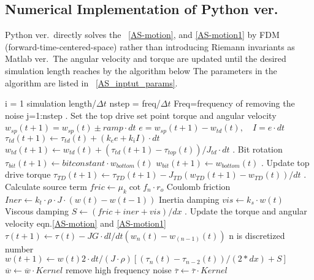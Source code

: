 \subsection{Numerical Implementation of Python ver.}
Python ver.\ directly solves the \equationname~\ref{AS-motion}, and \ref{AS-motion1} by FDM (forward-time-centered-space) rather than introducing Riemann invariants as Matlab ver.\ The angular velocity and torque are updated until the desired simulation length reaches by the algorithm below The parameters in the algorithm are listed in \tablename~\ref{AS_inptut_params}. 
\newcommand{\codecomment}[1]{\hfill #1}
\pushinitialcodeindent{0in}
\begin{code}[\codenumbering]{}
\codeitemnonumber \pseudocodefor{} i = 1 simulation length/$\Delta t$
	\stepcodelevel{}
	\codeitemnonumber nstep = freq/$\Delta t$ \codecomment{Freq=frequency of removing the noise}
	\codeitemnonumber \pseudocodefor{} {j=1:nstep}
		\stepcodelevel{}
	    . Set the top drive set point torque and angular velocity
	    \codeitemnonumber $w_{sp}(t+1)=w_{sp}(t)\pm ramp \cdot dt$
	    \codeitemnonumber $e=w_{sp}(t+1)-w_{td}(t), \quad I=e \cdot dt$
	    \codeitemnonumber $\tau_{td}(t+1) \gets \tau_{td}(t) + (k_e e + k_i I) \cdot dt$
	    \codeitemnonumber $w_{td}(t+1) \gets w_{td}(t) + (\tau_{td}(t+1)-\tau_{top}(t))/J_{td} \cdot dt$
	    . Bit rotation
	    \codeitemnonumber $\tau_{bit}(t+1) \gets bitconstant \cdot w_{bottom}(t)$
	    \codeitemnonumber $w_{bit}(t+1) \gets w_{bottom}(t)$
	    . Update top drive torque 
	    \codeitemnonumber $\tau_{TD}(t+1) \gets \tau_{TD}(t+1)-J_{TD}(w_{TD}(t+1)-w_{TD}(t))/dt$
	    . Calculate source term
	    \codeitemnonumber $fric \gets \mu_k \cot f_n \cdot r_o$ \codecomment{Coulomb friction}
	    \codeitemnonumber $Iner \gets k_t \cdot \rho \cdot J \cdot (w(t)-w(t-1))$ \codecomment{Inertia damping}
	    \codeitemnonumber $vis \gets k_s \cdot w(t)$ \codecomment{Viscous damping}
	    \codeitemnonumber $S \gets (fric+iner+vis)/dx$
	    . Update the torque and angular velocity \codecomment{eqn.\ref{AS-motion} and \ref{AS-motion1}}
	    \codeitemnonumber $\tau(t+1) \gets \tau(t) - JG \cdot dl/dt (w_n(t)-w_{(n-1)}(t))$ \codecomment{n is discretized number}
	    \codeitemnonumber $w(t+1) \gets w(t) 2 \cdot dt/(J \cdot \rho)\left[(\tau_n(t)-\tau_{n-2}(t))/(2*dx)+S\right]$
	    \prevcodelevel{}
	\codeitemnonumber \pseudocodedonefor{}
	\codeitemnonumber $\overline{w} \gets \overline{w} \cdot Kernel$ \codecomment{remove high frequency noise}
	\codeitemnonumber $\overline{\tau} \gets \overline{\tau} \cdot Kernel$
	\prevcodelevel{}
\codeitemnonumber \pseudocodedonefor{}
\end{code}
\popinitialcodeindent{}


